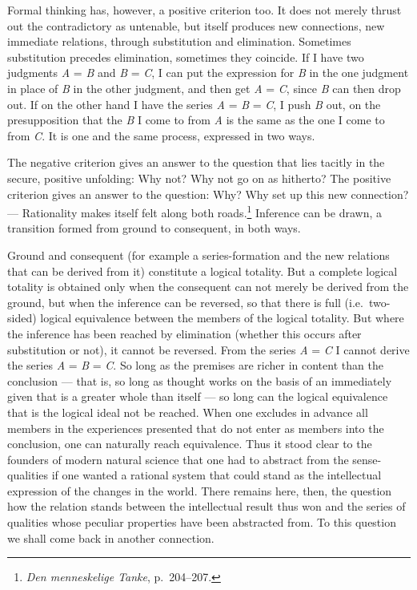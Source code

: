 \documentclass[12pt]{book}
\newcommand{\opage}[1]{\marginnote{\footnotesize\textit{[#1]}}}
\begin{document}
Formal thinking has, however, a positive criterion too. It does not merely thrust
out the contradictory as untenable, but itself produces new connections, new
immediate relations, through substitution and elimination. Sometimes substitution
precedes elimination, sometimes they coincide. If I have two judgments
\textit{A} = \textit{B} \opage{39}and \textit{B} = \textit{C}, I can put the expression for
\textit{B} in the one judgment in place of \textit{B} in the other judgment, and
then get \textit{A} = \textit{C}, since \textit{B} can then drop out. If on the
other hand I have the series \textit{A} = \textit{B} = \textit{C}, I push
\textit{B} out, on the presupposition that the \textit{B} I come to from
\textit{A} is the same as the one I come to from \textit{C}. It is one and the
same process, expressed in two ways.

The negative criterion gives an answer to the question that lies tacitly in the
secure, positive unfolding: Why not? Why not go on as hitherto? The positive
criterion gives an answer to the question: Why? Why set up this new connection?
--- Rationality makes itself felt along both
roads.\footnote{\textit{Den menneskelige Tanke}, p.\ 204--207.} Inference can be
drawn, a transition formed from ground to consequent, in both ways.

Ground and consequent (for example a series-formation and the new relations that
can be derived from it) constitute a logical totality. But a complete logical
totality is obtained only when the consequent can not merely be derived from the
ground, but when the inference can be reversed, so that there is full (i.e.\
two-sided) logical equivalence between the members of the logical totality. But
where the inference has been reached by elimination (whether this occurs after
substitution or not), it cannot be reversed. From the series \textit{A} =
\textit{C} I cannot derive the series \textit{A} = \textit{B} = \textit{C}. So
long as the premises are richer in content than the conclusion --- that is, so
long as thought works on the basis of an immediately given that is a greater
whole than itself --- so long can the logical equivalence that is the logical
ideal not be reached. When one excludes in advance all members in the experiences
presented that do not enter as members into the conclusion, one can naturally
reach equivalence. Thus it stood clear to the founders of modern natural science
that one had to abstract from the sense-qualities if one wanted a rational system
that could stand as the intellectual expression of the changes in the world.
There remains here, then, the question how the relation stands between the
intellectual result thus won and the series of qualities whose peculiar
properties have been abstracted from. To this question we shall come back in
another connection.
\end{document}
